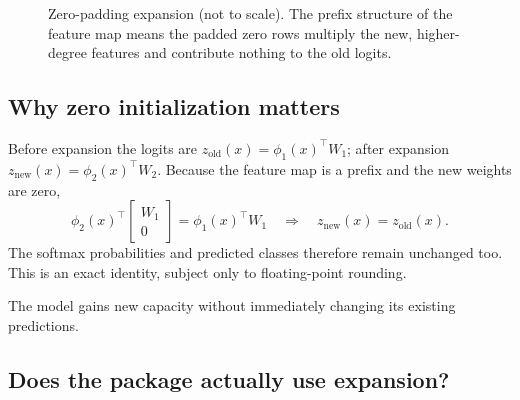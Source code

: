 \documentclass[11pt,a4paper]{article}
\begin{document}
\begin{figure}[h]
\centering
{}
\caption{Zero-padding expansion (not to scale). The prefix structure of the feature map means the padded zero rows multiply the new, higher-degree features and contribute nothing to the old logits.}
\end{figure}

\subsection{Why zero initialization matters}

Before expansion the logits are $z_{\text{old}}(x)=\phi_1(x)^\top W_1$; after expansion $z_{\text{new}}(x)=\phi_2(x)^\top W_2$. Because the feature map is a prefix and the new weights are zero,
\[
\phi_2(x)^\top\begin{bmatrix}W_1\\0\end{bmatrix}=\phi_1(x)^\top W_1
\quad\Longrightarrow\quad
\boxed{z_{\text{new}}(x)=z_{\text{old}}(x)}.
\]
The softmax probabilities and predicted classes therefore remain unchanged too. This is an exact identity, subject only to floating-point rounding.

\begin{keybox}
The model gains new capacity without immediately changing its existing predictions.
\end{keybox}

\subsection{Does the package actually use expansion?}
\end{document}
